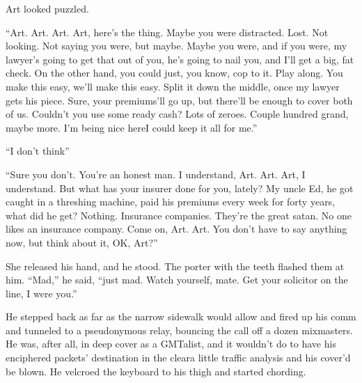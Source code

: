 Art looked puzzled.

“Art. Art. Art. Art, here’s the thing. Maybe you were distracted.
Lost. Not looking. Not saying you were, but maybe. Maybe you were,
and if you were, my lawyer’s going to get that out of you, he’s
going to nail you, and I’ll get a big, fat check. On the other
hand, you could just, you know, cop to it. Play along. You make
this easy, we’ll make this easy. Split it down the middle, once my
lawyer gets his piece. Sure, your premiums’ll go up, but there’ll
be enough to cover both of us. Couldn’t you use some ready cash?
Lots of zeroes. Couple hundred grand, maybe more. I’m being nice
here{\dash}I could keep it all for me.”

“I don’t think{\dash}”

“Sure you don’t. You’re an honest man. I understand, Art. Art. Art,
I understand. But what has your insurer done for you, lately? My
uncle Ed, he got caught in a threshing machine, paid his premiums
every week for forty years, what did he get? Nothing. Insurance
companies. They’re the great satan. No one likes an insurance
company. Come on, Art. Art. You don’t have to say anything now, but
think about it, OK, Art?”

She released his hand, and he stood. The porter with the teeth
flashed them at him. “Mad,” he said, “just mad. Watch yourself,
mate. Get your solicitor on the line, I were you.”

He stepped back as far as the narrow sidewalk would allow and fired
up his comm and tunneled to a pseudonymous relay, bouncing the call
off a dozen mixmasters. He was, after all, in deep cover as a
GMTalist, and it wouldn’t do to have his enciphered packets’
destination in the clear{\dash}a little traffic analysis and his cover’d
be blown. He velcroed the keyboard to his thigh and started
chording.

